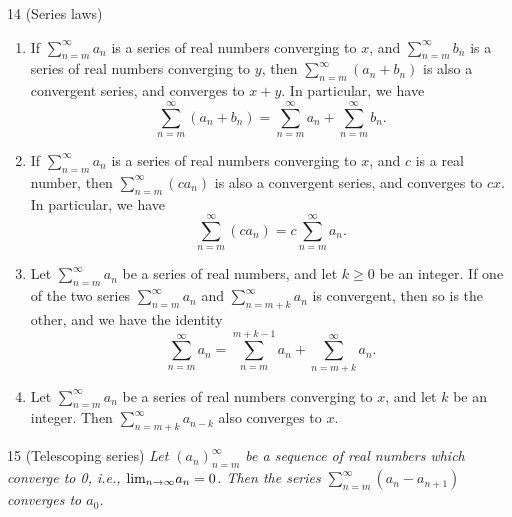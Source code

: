 \begin{proposition}{14}
    \label{series-laws}
    (Series laws)
    \begin{enumerate}
        \item If $\sum_{n=m}^{\infty} a_n$ is a series of real numbers converging
        to $x$, and $\sum_{n=m}^{\infty} b_n$ is a series of real numbers converging
        to $y$, then $\sum_{n=m}^{\infty} (a_n + b_n)$ is also a convergent series,
        and converges to $x + y$. In particular, we have
        \begin{equation*}
            \sum_{n=m}^{\infty} (a_n + b_n) = \sum_{n=m}^{\infty} a_n + \sum_{n=m}^{\infty} b_n.
        \end{equation*}
        \item If $\sum_{n=m}^{\infty} a_n$ is a series of real numbers converging
        to $x$, and $c$ is a real number, then $\sum_{n=m}^{\infty} (ca_n)$ is also
        a convergent series, and converges to $cx$. In particular, we have
        \begin{equation*}
            \sum_{n=m}^{\infty} (ca_n) = c \sum_{n=m}^{\infty} a_n.
        \end{equation*}
        \item Let $\sum_{n=m}^{\infty} a_n$ be a series of real numbers, and let
        $k \geq 0$ be an integer. If one of the two series $\sum_{n=m}^{\infty} a_n$
        and $\sum_{n=m+k}^{\infty} a_n$ is convergent, then so is the other, and
        we have the identity
        \begin{equation*}
            \sum_{n=m}^{\infty} a_n = \sum_{n=m}^{m+k-1} a_n + \sum_{n=m+k}^{\infty} a_n.
        \end{equation*}
        \item Let $\sum_{n=m}^{\infty} a_n$ be a series of real numbers converging
        to $x$, and let $k$ be an integer. Then $\sum_{n=m+k}^{\infty} a_{n-k}$
        also converges to $x$.
    \end{enumerate}
\end{proposition}

\begin{lemma}{15}
    \label{telescoping-series}
    (Telescoping series) \emph{Let $(a_n)_{n=m}^{\infty}$ be a sequence of real numbers
    which converge to 0, i.e., $\text{lim}_{n \rightarrow \infty}{a_n} = 0$. Then the series $\sum_{n=m}^{\infty} (a_n - a_{n+1})$
    converges to $a_0$.}
\end{lemma}

